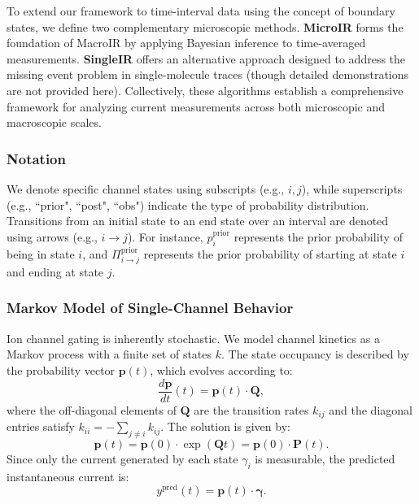 \documentclass[9pt]{elife}
\begin{document}
To extend our framework to time-interval data using the concept of boundary states, we define two complementary microscopic methods. \textbf{MicroIR} forms the foundation of MacroIR by applying Bayesian inference to time-averaged measurements. \textbf{SingleIR} offers an alternative approach designed to address the missing event problem in single-molecule traces (though detailed demonstrations are not provided here). Collectively, these algorithms establish a comprehensive framework for analyzing current measurements across both microscopic and macroscopic scales.

\subsubsection{Notation}
We denote specific channel states using subscripts (e.g., \( i, j \)), while superscripts (e.g., ``prior", ``post", ``obs") indicate the type of probability distribution. Transitions from an initial state to an end state over an interval are denoted using arrows (e.g., $i \rightarrow j$). For instance, \( p_i^{\text{prior}} \) represents the prior probability of being in state \( i \), and $\Pi_{i \rightarrow j}^{\text{prior}}$ represents the prior probability of starting at state $i$ and ending at state $j$.

\subsubsection{Markov Model of Single-Channel Behavior}
\label{sec:SingleChannel}
Ion channel gating is inherently stochastic. We model channel kinetics as a Markov process with a finite set of states \(k\). The state occupancy is described by the probability vector \(\boldsymbol{p}(t)\), which evolves according to:
\begin{equation}
	\frac{d\boldsymbol{p}}{dt}(t) = \boldsymbol{p}(t)\cdot \boldsymbol{Q},
	\label{eq:master_equation}
\end{equation}
where the off-diagonal elements of \(\boldsymbol{Q}\) are the transition rates \(k_{ij}\) and the diagonal entries satisfy \( k_{ii} = -\sum_{j\neq i} k_{ij} \). The solution is given by:
\begin{equation}
	\boldsymbol{p}(t) = \boldsymbol{p}(0) \cdot \exp(\boldsymbol{Q}t) = \boldsymbol{p}(0) \cdot \mathbf{P}(t).
	\label{eq:master_solution}
\end{equation}
Since only the current generated by each state \(\gamma_i\) is measurable, the predicted instantaneous current is:
\begin{equation}
	y^{\text{pred}}(t) = \boldsymbol{p}(t)\cdot \boldsymbol{\gamma}.
	\label{eq:current_pred}
\end{equation}
\end{document}
